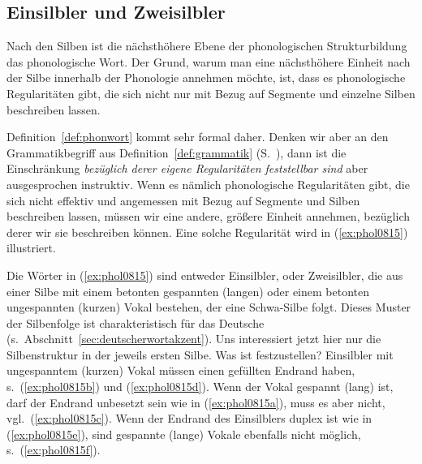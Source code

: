 \subsection{Einsilbler und Zweisilbler}

\label{sec:zweisilbler}

Nach den Silben ist die nächsthöhere Ebene der phonologischen Strukturbildung das phonologische Wort.
Der Grund, warum man eine nächsthöhere Einheit nach der Silbe innerhalb der Phonologie annehmen möchte, ist, dass es phonologische Regularitäten gibt, die sich nicht nur mit Bezug auf Segmente und einzelne Silben beschreiben lassen.


Definition~\ref{def:phonwort} kommt sehr formal daher.
Denken wir aber an den Grammatikbegriff aus Definition~\ref{def:grammatik} (S.~\pageref{def:grammatik}), dann ist die Einschränkung \textit{bezüglich derer eigene Regularitäten feststellbar sind} aber ausgesprochen instruktiv.
Wenn es nämlich phonologische Regularitäten gibt, die sich nicht effektiv und angemessen mit Bezug auf Segmente und Silben beschreiben lassen, müssen wir eine andere, größere Einheit annehmen, bezüglich derer wir sie beschreiben können.
Eine solche Regularität wird in (\ref{ex:phol0815}) illustriert.

\begin{exe}
  \ex\label{ex:phol0815}
  \begin{xlist}
  	\ex{\label{ex:phol0815b} *\textipa{[knI]}}
  	\ex{\label{ex:phol0815f} *\textipa{[vi:Nk]}}
  	\ex{\label{ex:phol0815k} *\textipa{[v\t{i5}k.t@]}}
  \end{xlist}
\end{exe}

Die Wörter in (\ref{ex:phol0815}) sind entweder Einsilbler, oder Zweisilbler, die aus einer Silbe mit einem betonten gespannten (langen) oder einem betonten ungespannten (kurzen) Vokal bestehen, der eine Schwa-Silbe folgt.
Dieses Muster der Silbenfolge ist charakteristisch für das Deutsche (s.\ Abschnitt~\ref{sec:deutscherwortakzent}).
Uns interessiert jetzt hier nur die Silbenstruktur in der jeweils ersten Silbe.
Was ist festzustellen?
Einsilbler mit ungespanntem (kurzen) Vokal müssen einen gefüllten Endrand haben, s.\ (\ref{ex:phol0815b}) und (\ref{ex:phol0815d}).
Wenn der Vokal gespannt (lang) ist, darf der Endrand unbesetzt sein wie in (\ref{ex:phol0815a}), muss es aber nicht, vgl.\ (\ref{ex:phol0815c}).
Wenn der Endrand des Einsilblers duplex ist wie in (\ref{ex:phol0815e}), sind gespannte (lange) Vokale ebenfalls nicht möglich, s.\ (\ref{ex:phol0815f}).

